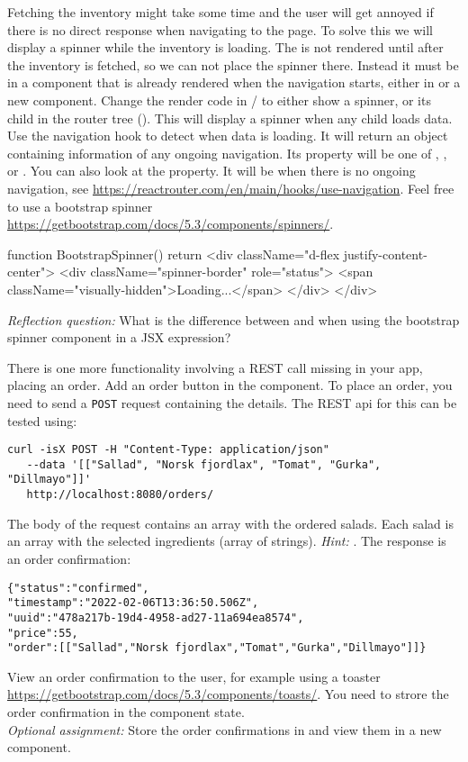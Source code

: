 \documentclass[fleqn, article, a4paper]{memoir}
\begin{document}
\begin{Assignments}
\item Fetching the inventory might take some time and the user will get annoyed if there is no direct response when navigating to the  page. To solve this we will display a spinner while the inventory is loading. The  is not rendered until after the inventory is fetched, so we can not place the spinner there. Instead it must be in a component that is already rendered when the navigation starts, either in  or a new  component. Change the render code in / to either show a spinner, or its child in the router tree (). This will display a spinner when any child loads data. Use the navigation hook to detect when data is loading. It will return an object containing information of any ongoing navigation. Its  property will be one of , , or . You can also look at the  property. It will be  when there is no ongoing navigation, see \url{https://reactrouter.com/en/main/hooks/use-navigation}. Feel free to use a bootstrap spinner \url{https://getbootstrap.com/docs/5.3/components/spinners/}.
\begin{Code}
function BootstrapSpinner() {
  return <div className="d-flex justify-content-center">
    <div className="spinner-border" role="status">
      <span className="visually-hidden">Loading...</span>
    </div>
  </div>
}
\end{Code}
\emph{Reflection question:} What is the difference between  and  when using the bootstrap spinner component in a JSX expression?

\item There is one more functionality involving a REST call missing in your app, placing an order. Add an order button in the  component. To place an order, you need to send a \texttt{POST} request containing the details. The REST api for this can be tested using:
\\ \noindent \begin{verbatim}
curl -isX POST -H "Content-Type: application/json" 
   --data '[["Sallad", "Norsk fjordlax", "Tomat", "Gurka", "Dillmayo"]]'
   http://localhost:8080/orders/
\end{verbatim}
\noindent The body of the request contains an array with the ordered salads. Each salad is an array with the selected ingredients (array of strings). \emph{Hint:} . The response is an order confirmation:
\begin{verbatim}
{"status":"confirmed",
"timestamp":"2022-02-06T13:36:50.506Z",
"uuid":"478a217b-19d4-4958-ad27-11a694ea8574",
"price":55,
"order":[["Sallad","Norsk fjordlax","Tomat","Gurka","Dillmayo"]]}
\end{verbatim}
\noindent View an order confirmation to the user, for example using a toaster \url{https://getbootstrap.com/docs/5.3/components/toasts/}. You need to strore the order confirmation in the component state.
\\\emph{Optional assignment:} Store the order confirmations in  and view them in a new component.


\end{Assignments}
\end{document}
